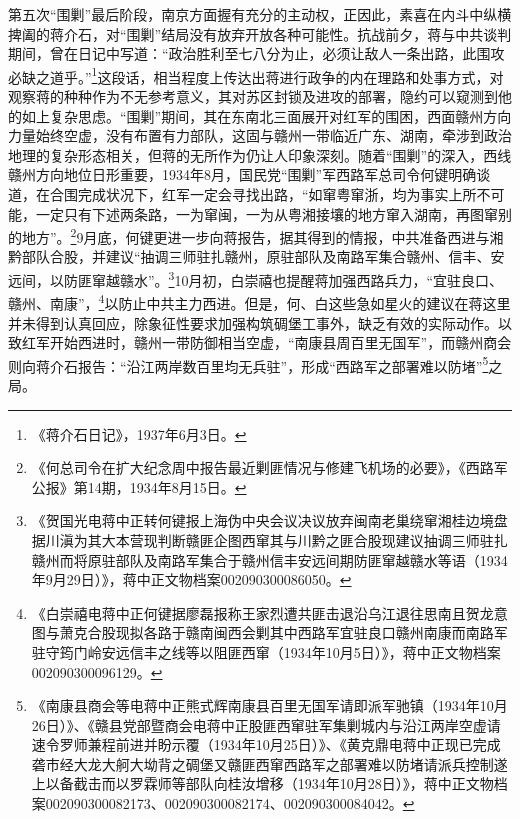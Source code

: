 第五次“围剿”最后阶段，南京方面握有充分的主动权，正因此，素喜在内斗中纵横捭阖的蒋介石，对“围剿”结局没有放弃开放各种可能性。抗战前夕，蒋与中共谈判期间，曾在日记中写道：“政治胜利至七八分为止，必须让敌人一条出路，此围攻必缺之道乎。”\footnote{《蒋介石日记》，1937年6月3日。}这段话，相当程度上传达出蒋进行政争的内在理路和处事方式，对观察蒋的种种作为不无参考意义，其对苏区封锁及进攻的部署，隐约可以窥测到他的如上复杂思虑。“围剿”期间，其在东南北三面展开对红军的围困，西面赣州方向力量始终空虚，没有布置有力部队，这固与赣州一带临近广东、湖南，牵涉到政治地理的复杂形态相关，但蒋的无所作为仍让人印象深刻。随着“围剿”的深入，西线赣州方向地位日形重要，1934年8月，国民党“围剿”军西路军总司令何键明确谈道，在合围完成状况下，红军一定会寻找出路，“如窜粤窜浙，均为事实上所不可能，一定只有下述两条路，一为窜闽，一为从粤湘接壤的地方窜入湖南，再图窜别的地方”。\footnote{《何总司令在扩大纪念周中报告最近剿匪情况与修建飞机场的必要》，《西路军公报》第14期，1934年8月15日。}9月底，何键更进一步向蒋报告，据其得到的情报，中共准备西进与湘黔部队合股，并建议“抽调三师驻扎赣州，原驻部队及南路军集合赣州、信丰、安远间，以防匪窜越赣水”。\footnote{《贺国光电蒋中正转何键报上海伪中央会议决议放弃闽南老巢绕窜湘桂边境盘据川滇为其大本营现判断赣匪企图西窜其与川黔之匪合股现建议抽调三师驻扎赣州而将原驻部队及南路军集合于赣州信丰安远间期防匪窜越赣水等语（1934年9月29日）》，蒋中正文物档案002090300086050。}10月初，白崇禧也提醒蒋加强西路兵力，“宜驻良口、赣州、南康”，\footnote{《白崇禧电蒋中正何键据廖磊报称王家烈遭共匪击退沿乌江退往思南且贺龙意图与萧克合股现拟各路于赣南闽西会剿其中西路军宜驻良口赣州南康而南路军驻守筠门岭安远信丰之线等以阻匪西窜（1934年10月5日）》，蒋中正文物档案002090300096129。}以防止中共主力西进。但是，何、白这些急如星火的建议在蒋这里并未得到认真回应，除象征性要求加强构筑碉堡工事外，缺乏有效的实际动作。以致红军开始西进时，赣州一带防御相当空虚，“南康县周百里无国军”，而赣州商会则向蒋介石报告：“沿江两岸数百里均无兵驻”，形成“西路军之部署难以防堵”\footnote{《南康县商会等电蒋中正熊式辉南康县百里无国军请即派军驰镇（1934年10月26日）》、《赣县党部暨商会电蒋中正股匪西窜驻军集剿城内与沿江两岸空虚请速令罗师兼程前进并盼示覆（1934年10月25日）》、《黄克鼎电蒋中正现已完成砻市经大龙大舸大坳背之碉堡又赣匪西窜西路军之部署难以防堵请派兵控制遂上以备截击而以罗霖师等部队向桂汝增移（1934年10月28日）》，蒋中正文物档案002090300082173、002090300082174、002090300084042。}之局。


